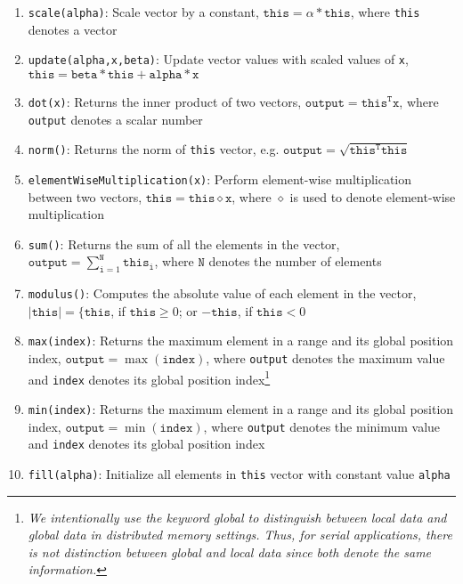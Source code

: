     \begin{enumerate}
    \item \texttt{scale(alpha)}: Scale vector by a constant, $\mathtt{this} = \alpha\ast\mathtt{this}$, where \texttt{this} denotes a vector
    \item \texttt{update(alpha,x,beta)}: Update vector values with scaled values of \texttt{x}, $\mathtt{this} = \mathtt{beta}\ast\mathtt{this} + \mathtt{alpha}\ast\mathtt{x}$
    \item \texttt{dot(x)}: Returns the inner product of two vectors, $\mathtt{output} = \mathtt{this}^{\mathtt{T}}\mathtt{x}$, where \texttt{output} denotes a scalar number
    \item \texttt{norm()}: Returns the norm of \texttt{this} vector, e.g. $\mathtt{output} = \sqrt{\mathtt{this}^{\mathtt{T}}\mathtt{this}}$
    \item \texttt{elementWiseMultiplication(x)}: Perform element-wise multiplication between two vectors, $\mathtt{this} = \mathtt{this}\diamond\mathtt{x}$,  where $\diamond$ is used to denote element-wise multiplication
    \item \texttt{sum()}: Returns the sum of all the elements in the vector, $\mathtt{output} = \sum_{\mathtt{i}=1}^{\mathtt{N}}\mathtt{this}_{\mathtt{i}}$, where $\mathtt{N}$ denotes the number of elements
    \item \texttt{modulus()}: Computes the absolute value of each element in the vector, $\vert\mathtt{this}\vert=\{\mathtt{this}$, if $\mathtt{this}\geq{0}$; or $-\mathtt{this}$, if $\mathtt{this}<{0}$
    \item \texttt{max(index)}: Returns the maximum element in a range and its global position index, $\mathtt{output}=\max(\mathtt{index})$, where \texttt{output} denotes the maximum value and \texttt{index} denotes its global position index\footnote{\emph{We intentionally use the keyword global to distinguish between local data and global data in distributed memory settings. Thus, for serial applications, there is not distinction between global and local data since both denote the same information.}}
    \item \texttt{min(index)}: Returns the maximum element in a range and its global position index, $\mathtt{output}=\min(\mathtt{index})$, where \texttt{output} denotes the minimum value and \texttt{index} denotes its global position index
    \item \texttt{fill(alpha)}: Initialize all elements in \texttt{this} vector with constant value \texttt{alpha}

\end{enumerate}
